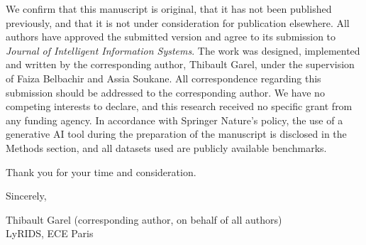 \documentclass[10pt]{article}
\begin{document}
We confirm that this manuscript is original, that it has not been published previously, and that it is not under consideration for publication elsewhere.
All authors have approved the submitted version and agree to its submission to \textit{Journal of Intelligent Information Systems}.
The work was designed, implemented and written by the corresponding author, Thibault Garel, under the supervision of Faiza Belbachir and Assia Soukane.
All correspondence regarding this submission should be addressed to the corresponding author.
We have no competing interests to declare, and this research received no specific grant from any funding agency.
In accordance with Springer Nature's policy, the use of a generative AI tool during the preparation of the manuscript is disclosed in the Methods section, and all datasets used are publicly available benchmarks.

Thank you for your time and consideration.

\vspace{0.9em}

\noindent
Sincerely,

\vspace{0.4em}

\noindent
Thibault Garel (corresponding author, on behalf of all authors)\\
LyRIDS, ECE Paris
\end{document}
